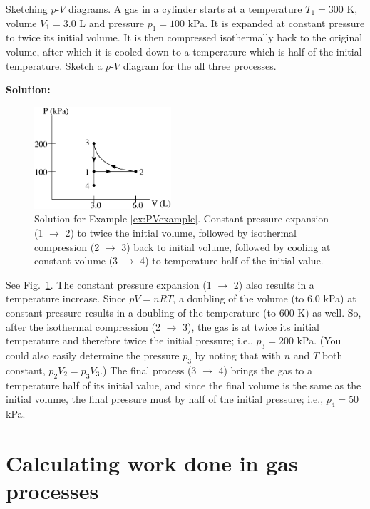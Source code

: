 \begin{example}{Sketching $p$-$V$ diagrams.}
A gas in a cylinder starts at a temperature $T_1 = 300$ K, volume 
$V_1 = 3.0$ L and pressure $p_1 = 100$ kPa. It
is expanded at constant pressure to twice its initial volume. It is then
compressed isothermally back to the original volume, after which
it is cooled down to a temperature which is half of the initial temperature.
Sketch a $p$-$V$ diagram for the all three processes.

{\bf Solution:} 
\begin{figure}
\begin{center}
\includegraphics[width=2.0in]{gas_processes/PVexample.eps}
\caption{Solution for Example \ref{ex:PVexample}. Constant pressure
  expansion (1 $\rightarrow$ 2) to twice the initial volume, followed
  by isothermal compression (2 $\rightarrow$ 3) back to initial
  volume, followed by cooling at constant volume (3 $\rightarrow$ 4)
  to temperature half of the initial value.}
\label{fig:PVexample}
\end{center}
\end{figure}
See Fig.~\ref{fig:PVexample}. The constant
pressure expansion (1 $\rightarrow$ 2) also results in a temperature
increase.  Since $pV = nRT$, a doubling of the volume (to 6.0 kPa) at constant
pressure results in a doubling of the temperature (to $600$ K) as well.  So,
after the isothermal compression (2 $\rightarrow$ 3), the gas
is at twice its initial temperature and therefore twice the
initial pressure; i.e., $p_3 = 200$ kPa.  (You could also easily determine
the pressure $p_3$ by noting that with $n$ and $T$ both constant, 
$p_2V_2 = p_3V_3$.) The final process 
(3 $\rightarrow$ 4) brings the gas to a temperature
half of its initial value, and since the final volume is the same
as the initial volume, the final pressure must by half of the initial
pressure; i.e., $p_4 = 50$ kPa.
\label{ex:PVexample}
\end{example}


\section{Calculating work done in gas processes}
\label{section:CalcWork}

